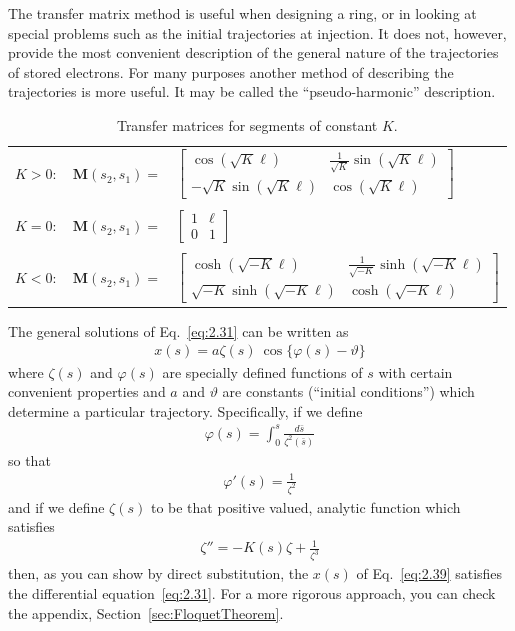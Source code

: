 The transfer matrix method is useful when designing a ring, or in looking at special problems such as the initial trajectories at injection. It does not, however, provide the most convenient description of the general nature of the trajectories of stored electrons. For many purposes another method of describing the trajectories is more useful. It may be called the ``pseudo-harmonic'' description.
\begin{table}[!ht]
	\caption{Transfer matrices for segments of constant $K$.}
	\centering
	\begin{tabular}{lrl}
		$K>0:$ & $\boldsymbol{M}(s_2,s_1) =$ &  $\begin{bmatrix}
			\cos(\sqrt{K}\ell) & \frac{1}{\sqrt{K}}\sin(\sqrt{K}\ell)\\
			-\sqrt{K}\sin(\sqrt{K}\ell) & \cos(\sqrt{K}\ell)
			\end{bmatrix}$\\
		\\
		$K=0$: & $\boldsymbol{M}(s_2,s_1) =$ & $\begin{bmatrix}
			1 & \ell\\
			0 & 1
			\end{bmatrix}$\\
		\\
		$K<0:$ & $\boldsymbol{M}(s_2,s_1) =$ & $\begin{bmatrix}
				\cosh(\sqrt{-K}\ell) & \frac{1}{\sqrt{-K}}\sinh(\sqrt{-K}\ell)\\
				\sqrt{-K}\sinh(\sqrt{-K}\ell) & \cosh(\sqrt{-K}\ell)
				\end{bmatrix}$
	\end{tabular}
	\label{tab:tab1}
\end{table}

The general solutions of Eq.~\eqref{eq:2.31} can be written as
\begin{align}
	x(s) = a\zeta(s)\ \cos\{\varphi(s)-\vartheta\}\label{eq:2.39}
\end{align}
where $\zeta(s)$ and $\varphi(s)$ are specially defined functions of $s$ with certain convenient properties and $a$ and $\vartheta$ are constants (``initial conditions'') which determine a particular trajectory. Specifically, if we define
\begin{align}
	\varphi(s) = \int_{0}^{s} \frac{d\bar{s}}{\zeta^2(\bar{s})}
\end{align}
so that
\begin{align}
	\varphi'(s) = \frac{1}{\zeta^2}
\end{align}
and if we define $\zeta(s)$ to be that positive valued, analytic function which satisfies
\begin{align}
	\zeta'' = -K(s)\zeta+\frac{1}{\zeta^3}\label{eq:2.42}
\end{align}
then, as you can show by direct substitution, the $x(s)$ of Eq.~\eqref{eq:2.39} satisfies the differential equation~\eqref{eq:2.31}. For a more rigorous approach, you can check the appendix, Section~\ref{sec:FloquetTheorem}.

